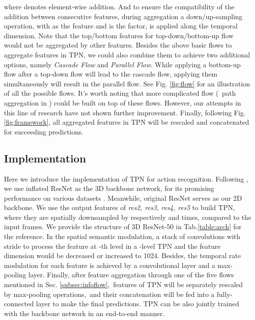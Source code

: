 \documentclass[10pt,twocolumn,letterpaper]{article}
\begin{document}
where  denotes element-wise addition.
And to ensure the compatibility of the addition between consecutive features,
during aggregation a down/up-sampling operation,  with  as the feature and  is the factor, is applied along the temporal dimension.
Note that the top/bottom features for top-down/bottom-up flow would not be aggregated by other features.
Besides the above basic flows to aggregate features in TPN, we could also combine them to achieve two additional options, namely \emph{Cascade Flow} and \emph{Parallel Flow}.
While applying a bottom-up flow after a top-down flow will lead to the cascade flow, applying them simultaneously will result in the parallel flow.
See Fig. \ref{fig:flow} for an illustration of all the possible flows. 
It's worth noting that more complicated flow (\eg~path aggregation in \cite{panet}) could be built on top of these flows.
However, our attempts in this line of research have not shown further improvement.
Finally, following Fig.\ref{fig:framework}, all aggregated features in TPN will be rescaled and concatenated for succeeding predictions.

\subsection{Implementation}\label{subsec:application}
Here we introduce the implementation of TPN for action recognition.
Following \cite{slowfast}, we use inflated ResNet \cite{slowfast} as the 3D backbone network, for its promising performance on various datasets \cite{kinetics}.
Meanwhile, original ResNet \cite{resnet} serves as our 2D backbone.
We use the output features of \emph{res2, res3, res4, res5} to build TPN,
where they are spatially downsampled by respectively  and  times, compared to the input frames.
We provide the structure of 3D ResNet-50 in Tab.\ref{table:arch} for the reference.
In the spatial semantic modulation, a stack of convolutions with  stride to process the feature at -th level in a -level TPN and the feature dimension would be decreased or increased to 1024.
Besides, the temporal rate modulation for each feature is achieved by a convolutional layer and a max-pooling layer.
Finally, after feature aggregation through one of the five flows mentioned in Sec. \ref{subsec:infoflow},\
features of TPN will be separately rescaled by max-pooling operations,\
and their concatenation will be fed into a fully-connected layer to make the final predictions.
TPN can be also jointly trained with the backbone network in an end-to-end manner.
\end{document}
